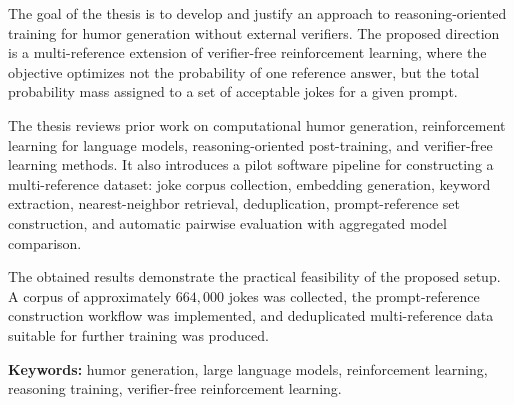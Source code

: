 The goal of the thesis is to develop and justify an approach to reasoning-oriented training for humor generation without external verifiers. The proposed direction is a multi-reference extension of verifier-free reinforcement learning, where the objective optimizes not the probability of one reference answer, but the total probability mass assigned to a set of acceptable jokes for a given prompt.

The thesis reviews prior work on computational humor generation, reinforcement learning for language models, reasoning-oriented post-training, and verifier-free learning methods. It also introduces a pilot software pipeline for constructing a multi-reference dataset: joke corpus collection, embedding generation, keyword extraction, nearest-neighbor retrieval, deduplication, prompt-reference set construction, and automatic pairwise evaluation with aggregated model comparison.

The obtained results demonstrate the practical feasibility of the proposed setup. A corpus of approximately \(664{,}000\) jokes was collected, the prompt-reference construction workflow was implemented, and deduplicated multi-reference data suitable for further training was produced.

\textbf{Keywords:} humor generation, large language models, reinforcement learning, reasoning training, verifier-free reinforcement learning.

\clearpage
